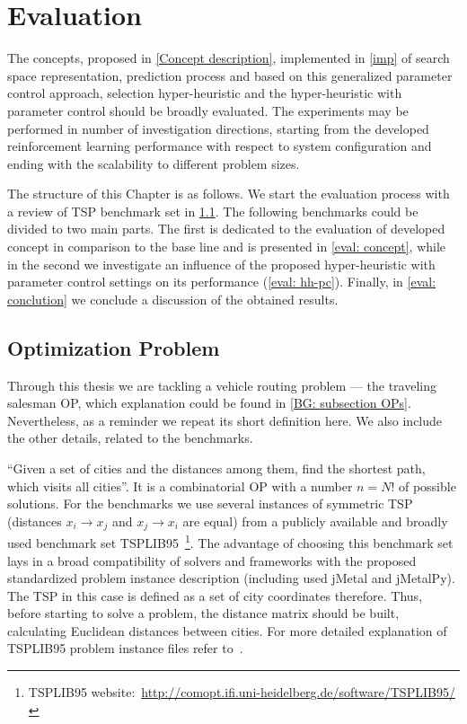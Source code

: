 \chapter{Evaluation}\label{eval}
The concepts, proposed in \cref{Concept description}, implemented in \cref{imp} of search space representation, prediction process and based on this generalized parameter control approach, selection hyper-heuristic and the hyper-heuristic with parameter control should be broadly evaluated. The experiments may be performed in number of investigation directions, starting from the developed reinforcement learning performance with respect to system configuration and ending with the scalability to different problem sizes.

The structure of this Chapter is as follows. We start the evaluation process with a review of TSP benchmark set in \cref{eval: op}. The following benchmarks could be divided to two main parts. The first is dedicated to the evaluation of developed concept in comparison to the base line and is presented in \cref{eval: concept}, while in the second we investigate an influence of the proposed hyper-heuristic with parameter control settings on its performance (\cref{eval: hh-pc}). Finally, in \cref{eval: conclution} we conclude a discussion of the obtained results.


\section{Optimization Problem}\label{eval: op}
Through this thesis we are tackling a vehicle routing problem — the traveling salesman OP, which explanation could be found in \cref{BG: subsection OPs}. Nevertheless, as a reminder we repeat its short definition here. We also include the other details, related to the benchmarks.

``Given a set of cities and the distances among them, find the shortest path, which visits all cities''. It is a combinatorial OP with a number $n = N!$ of possible solutions. For the benchmarks we use several instances of symmetric TSP (distances $x_i \rightarrow x_j$ and $x_j \rightarrow x_i$ are equal) from a publicly available and broadly used benchmark set TSPLIB95~\footnote{TSPLIB95 website:~\url{http://comopt.ifi.uni-heidelberg.de/software/TSPLIB95/}}. The advantage of choosing this benchmark set lays in a broad compatibility of solvers and frameworks with the proposed standardized problem instance description (including used jMetal and jMetalPy). The TSP in this case is defined as a set of city coordinates therefore. Thus, before starting to solve a problem, the distance matrix should be built, calculating Euclidean distances between cities. For more detailed explanation of TSPLIB95 problem instance files refer to~\cite{reinelt1995tsplib95}.

